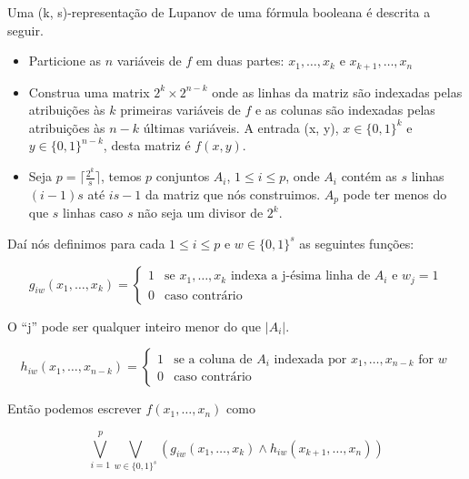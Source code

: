 \begin{defi} 

Uma (k, s)-representação de Lupanov de uma fórmula booleana é descrita a seguir.

\begin{itemize}

\item Particione as $n$ variáveis de $f$ em duas partes: $x_{1}, \dots, x_{k}$ e $x_{k + 1}, \dots, x_{n}$

\item Construa uma matrix $2^{k} \times 2^{n - k}$ onde as linhas da matriz são indexadas pelas atribuições às $k$ primeiras variáveis de $f$ e as colunas são indexadas pelas atribuições às $n - k$ últimas variáveis. A entrada (x, y), $x \in \{0, 1\}^{k}$ e $y \in \{0, 1\}^{n- k}$, desta matriz é $f(x, y)$.

\item Seja $p = \lceil \frac{2^k}{s} \rceil$, temos $p$ conjuntos $A_{i}$, $1 \leq i \leq p$, onde $A_{i}$ contém as $s$ linhas $(i - 1)s$ até $is - 1$ da matriz que nós construimos. $A_{p}$ pode ter menos do que $s$ linhas caso $s$ não seja um divisor de $2^{k}$.

\end{itemize}

Daí nós definimos para cada $1 \leq i \leq p$ e $w \in \{0, 1\}^{s}$ as seguintes funções:

\begin{equation*}
    g_{iw}(x_{1}, \dots, x_{k}) = \begin{cases}
        1 & \text{se } x_{1}, \dots, x_{k} \text{ indexa a j-ésima linha de } A_{i} \text{ e } w_{j} = 1 \\
        0 & \text{caso contrário}
    \end{cases}
\end{equation*}

O ``j'' pode ser qualquer inteiro menor do que $\lvert A_{i} \rvert$.

\begin{equation*}
    h_{iw}(x_{1}, \dots, x_{n - k}) = \begin{cases}
        1 & \text{se a coluna de } A_{i} \text{ indexada por } x_{1}, \dots, x_{n - k} \text{ for } w \\
        0 & \text{caso contrário} 
    \end{cases}
\end{equation*}

Então podemos escrever $f(x_{1}, \dots, x_{n})$ como

\begin{equation} \label{eq:lupanov}
  \bigvee_{i = 1}^{p} \bigvee_{w \in \{0, 1\}^{s}} (g_{iw}(x_{1}, \dots, x_{k}) \land h_{iw}(x_{k + 1}, \dots, x_{n}))
\end{equation}

\end{defi}

